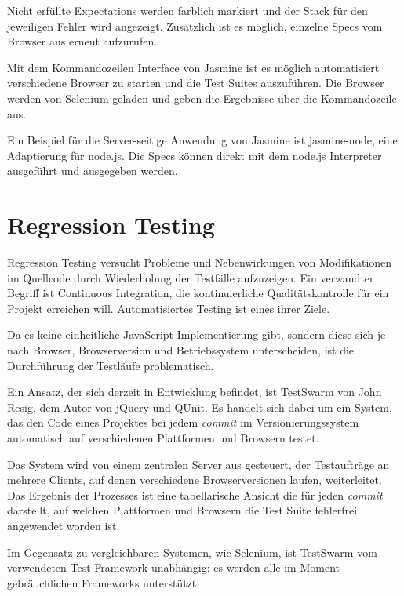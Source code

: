 \documentclass[11pt, a4paper]{article}
\begin{document}
Nicht erfüllte Expectations werden farblich markiert und der Stack für den
jeweiligen Fehler wird angezeigt. Zusätzlich ist es möglich, einzelne Specs vom
Browser aus erneut aufzurufen.

Mit dem Kommandozeilen Interface von Jasmine ist es möglich automatisiert
verschiedene Browser zu starten und die Test Suites auszuführen. Die Browser
werden von Selenium\cite{selenium_selenium_2011} geladen und geben die
Ergebnisse über die Kommandozeile aus.

Ein Beispiel für die Server-seitige Anwendung von Jasmine ist
jasmine-node\cite{hevery_jasmine-node_2011}, eine Adaptierung für node.js. Die
Specs können direkt mit dem node.js Interpreter ausgeführt und ausgegeben
werden.

\section{Regression Testing}

Regression Testing\cite{wikipedia_regression_2011} versucht Probleme und
Nebenwirkungen von Modifikationen im Quellcode durch Wiederholung der Testfälle
aufzuzeigen. Ein verwandter Begriff ist Continuous
Integration\cite{wikipedia_continuous_2011}, die kontinuierliche
Qualitätskontrolle für ein Projekt erreichen will. Automatisiertes Testing ist
eines ihrer Ziele. 

Da es keine einheitliche JavaScript Implementierung gibt, sondern
diese sich je nach Browser, Browserversion und Betriebssystem unterscheiden, ist
die Durchführung der Testläufe problematisch.

Ein Ansatz, der sich derzeit in Entwicklung befindet, ist
TestSwarm\cite{resig_testswarm_2011} von John Resig, dem Autor von jQuery und
QUnit. Es handelt sich dabei um ein System, das den Code eines Projektes bei
jedem \emph{commit} im Versionierungssystem automatisch auf verschiedenen
Plattformen und Browsern testet.

Das System wird von einem zentralen Server aus gesteuert, der Testaufträge an
mehrere Clients, auf denen verschiedene Browserversionen laufen, weiterleitet.
Das Ergebnis der Prozesses ist eine tabellarische Ansicht die für jeden
\emph{commit} darstellt, auf welchen Plattformen und Browsern die Test Suite
fehlerfrei angewendet worden ist.

Im Gegensatz zu vergleichbaren Systemen, wie
Selenium\cite{selenium_selenium_2011}, ist TestSwarm vom verwendeten Test
Framework unabhängig: es werden alle im Moment gebräuchlichen Frameworks
unterstützt.

\begin{flushleft}
  
  
\end{flushleft}
\end{document}
